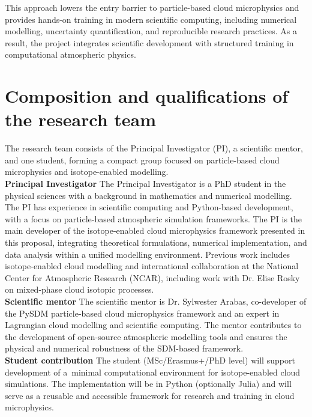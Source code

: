 \documentclass[12pt]{article}
\begin{document}
This approach lowers the entry barrier to particle-based
cloud microphysics and provides hands-on training in modern
scientific computing, including numerical modelling,
uncertainty quantification, and reproducible research practices.
As a result, the project integrates scientific development
with structured training in computational atmospheric physics.

\section*{Composition and qualifications of the research team}
The research team consists of the Principal Investigator (PI),
a scientific mentor, and one student, 
forming a compact group focused on particle-based cloud microphysics
and isotope-enabled modelling.
\\

\noindent\textbf{Principal Investigator}
The Principal Investigator is a PhD student in the physical
sciences with a background in mathematics and numerical modelling. 
The PI has experience in scientific computing and Python-based development,
with a focus on particle-based atmospheric simulation frameworks.
The PI is the main developer of the isotope-enabled cloud microphysics
framework presented in this proposal, integrating theoretical 
formulations, numerical implementation, and data analysis within
a unified modelling environment.
Previous work includes isotope-enabled cloud modelling 
and international collaboration at 
the National Center for Atmospheric Research (NCAR), 
including work with Dr. Elise Rosky on mixed-phase cloud isotopic processes.
\\

\noindent\textbf{Scientific mentor}
The scientific mentor is Dr. Sylwester Arabas,
co-developer of the PySDM particle-based cloud microphysics 
framework and an expert in Lagrangian cloud modelling and 
scientific computing.
The mentor contributes to the development of open-source
atmospheric modelling tools and ensures the physical and numerical 
robustness of the SDM-based framework.
\\

\noindent\textbf{Student contribution}
The student (MSc/Erasmus+/PhD level) will support development
of a~minimal computational environment for isotope-enabled cloud simulations.
The implementation will be in Python (optionally Julia) and will 
serve as a reusable and accessible framework for research and training
in cloud microphysics.
\\
\end{document}
